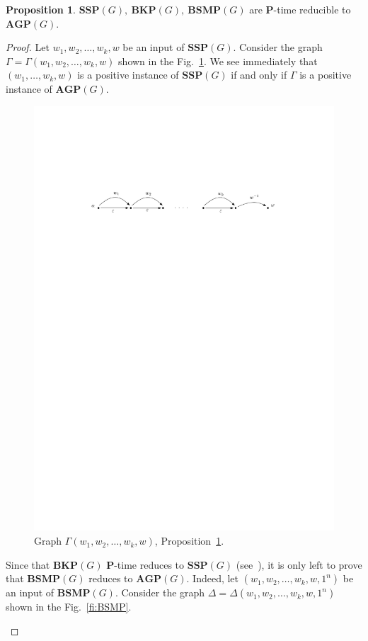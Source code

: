 \documentclass[10pt]{amsart}
\theoremstyle{definition}
\newtheorem{proposition}[theorem]{Proposition}
\def\P{{\mathbf{P}}}
\def\SSP{{\mathbf{SSP}}}
\def\BSMP{{\mathbf{BSMP}}}
\def\BKP{{\mathbf{BKP}}}
\def\AGP{{\mathbf{AGP}}}
\begin{document}
\begin{proposition}\label{pr:reduction_to_agp}
$\SSP(G),\ \BKP(G),\ \BSMP(G)$ are $\P$-time reducible to $\AGP(G)$.
\end{proposition}
\begin{proof} Let $w_1,w_2,\ldots, w_k, w$ be an input of $\SSP(G)$. Consider the graph $\Gamma=\Gamma(w_1,w_2,\ldots,w_k,w)$ shown in the Fig.~\ref{fi:SSP}. We see immediately that $(w_1,\ldots,w_k,w)$ is a positive instance of $\SSP(G)$ if and only if $\Gamma$ is a positive instance of $\AGP(G)$.
\begin{figure}[h]
 \centering
 \includegraphics[width=4.5in]{ssp.pdf}
 \caption{Graph $\Gamma(w_1,w_2,\ldots,w_k,w)$, Proposition~\ref{pr:reduction_to_agp}.}\label{fi:SSP}
\end{figure}
Since that $\BKP(G)$ $\P$-time reduces to $\SSP(G)$ (see~\cite{MNU1}), it is only left to prove that $\BSMP(G)$ reduces to $\AGP(G)$. Indeed, let $(w_1,w_2,\ldots,w_k,w,1^n)$ be an input of $\BSMP(G)$. Consider the graph $\Delta=\Delta(w_1,w_2,\ldots,w_k,w,1^n)$ shown in the Fig.~\ref{fi:BSMP}.
\begin{figure}[h]

\end{figure}
\end{proof}
\end{document}
